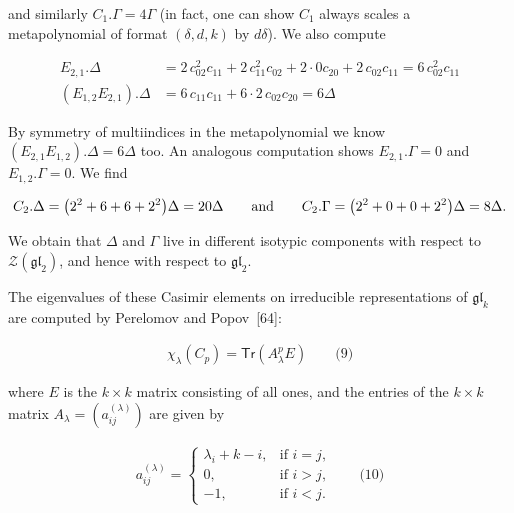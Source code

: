 \documentclass[10pt,a4paper]{article}
\begin{document}
and similarly $C_{1}.\Gamma=4\Gamma$ (in fact, one can show $C_{1}$ always scales a metapolynomial of format $(\delta,d,k)$ by $d\delta$).
We also compute



\[\begin{aligned}
\displaystyle E_{2,1}.\Delta & \displaystyle=2\,c_{02}^{2}c_{11}+2\,c_{11}^{2}c_{02}+2\cdot 0c_{20}+2\,c_{02}c_{11}=6\,c_{02}^{2}c_{11} \\
\displaystyle(E_{1,2}E_{2,1}).\Delta & \displaystyle=6\,c_{11}c_{11}+6\cdot 2\,c_{02}c_{20}=6\Delta
\end{aligned}\]


By symmetry of multiindices in the metapolynomial we know $(E_{2,1}E_{1,2}).\Delta=6\Delta$ too.
An analogous computation shows $E_{2,1}.\Gamma=0$ and $E_{1,2}.\Gamma=0$.
We find



\[\begin{aligned}
\displaystyle C_{2}.\Delta=\big{(}2^{2}+6+6+2^{2}\big{)}\Delta=20\Delta\qquad\text{and}\qquad C_{2}.\Gamma=\big{(}2^{2}+0+0+2^{2}\big{)}\Delta=8\Delta.
\end{aligned}\]


We obtain that $\Delta$ and $\Gamma$ live in different isotypic components with respect to
$\mathcal{Z}(\mathfrak{gl}_{2})$, and hence with respect to $\mathfrak{gl}_{2}$.






The eigenvalues of these Casimir elements on irreducible representations of $\mathfrak{gl}_{k}$ are computed by Perelomov and Popov [64]:



\[\begin{aligned}
\displaystyle\chi_{\lambda}(C_{p})=\mathsf{Tr}(A_{\lambda}^{p}E)\qquad\text{(9)}
\end{aligned}\]


where $E$ is the $k\times k$ matrix consisting of all ones, and the entries of the $k\times k$ matrix $A_{\lambda}=(a^{(\lambda)}_{ij})$ are given by



\[\begin{aligned}
\displaystyle a^{(\lambda)}_{ij}=\begin{cases}\lambda_{i}+k-i,&\text{if $i=j$,}\\ 0,&\text{if $i>j$,}\\ -1,&\text{if $i<j$.}\end{cases}\qquad\text{(10)}
\end{aligned}\]
\end{document}
